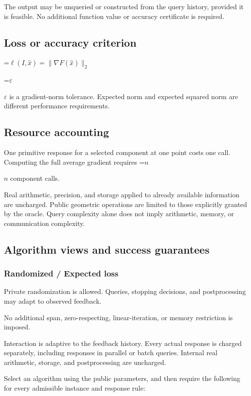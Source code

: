 \documentclass[10pt,a4paper]{article}
\newcommand{\AtlasMath}[1]{\par\begingroup\centering\setbox0=\hbox{$\displaystyle #1$}\ifdim\wd0>1.4\linewidth\typeout{ATLAS WIDE FORMULA: \the\wd0}\fi\ifdim\wd0>\linewidth\resizebox{\linewidth}{!}{\box0}\else\box0\fi\par\endgroup}
\newcommand{\AtlasInlineMath}[1]{\begingroup\setbox0=\hbox{$#1$}\ifdim\wd0>.4\linewidth\endgroup\AtlasMath{#1}\else\endgroup$#1$\fi}
\begin{document}
The output may be unqueried or constructed from the query history, provided it is feasible. No additional function value or accuracy certificate is required.

\subsection{Loss or accuracy criterion}

\AtlasMath{\ell(I,\widehat{x})=\|\nabla F(\widehat{x})\|_2}


\AtlasInlineMath{\varepsilon} is a gradient-norm tolerance. Expected norm and expected squared norm are different performance requirements.

\subsection{Resource accounting}
One primitive response for a selected component at one point costs one call. Computing the full average gradient requires \AtlasInlineMath{n} component calls.

Real arithmetic, precision, and storage applied to already available information are uncharged. Public geometric operations are limited to those explicitly granted by the oracle. Query complexity alone does not imply arithmetic, memory, or communication complexity.

\subsection{Algorithm views and success guarantees}
\subsubsection{Randomized / Expected loss}
Private randomization is allowed. Queries, stopping decisions, and postprocessing may adapt to observed feedback.

No additional span, zero-respecting, linear-iteration, or memory restriction is imposed.

Interaction is adaptive to the feedback history. Every actual response is charged separately, including responses in parallel or batch queries. Internal real arithmetic, storage, and postprocessing are uncharged.

Select an algorithm using the public parameters, and then require the following for every admissible instance and response rule:
\end{document}
